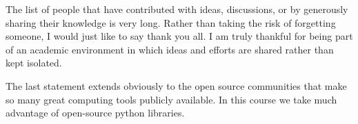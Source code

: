 \documentclass[%
oneside,                 %
final,                   %
10pt]{article}
\begin{document}
\noindent
The list of people that have contributed with ideas, discussions, or by generously sharing their knowledge is very long. Rather than taking the risk of forgetting someone, I would just like to say thank you all. I am truly thankful for being part of an academic environment in which ideas and efforts are shared rather than kept isolated.

The last statement extends obviously to the open source communities that make so many great computing tools publicly available. In this course we take much advantage of open-source python libraries.  


\end{document}

